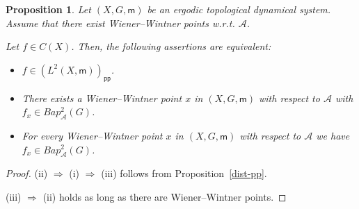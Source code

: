 \documentclass [14pt]{amsart}
\numberwithin{equation}{section}
\newcommand{\cA}{{\mathcal A}}
\newcommand{\mm}{\mathsf{m}}
\newcommand{\bap}{Bap}
\newtheorem{prop}[theorem]{Proposition}
\begin{document}
\begin{prop}\label{finpp} Let $(X,G,\mm)$ be an ergodic topological  dynamical system. Assume that there exist Wiener--Wintner points w.r.t. $\cA$.

Let $f \in C(X)$. Then, the following assertions  are equivalent:
\begin{itemize}
  \item[(i)] $f \in (L^2(X,\mm))_{\mathsf{pp}}$.
  \item[(ii)] There exists a Wiener--Wintner point $x$  in $(X,G,\mm)$ with respect to $\cA$  with $f_x \in \bap^2_{\cA}(G)$.
\item[(iii)] For every Wiener--Wintner point $x$ in $(X,G,\mm)$ with respect to $\cA$ we have $f_x \in \bap^2_{\cA}(G)$.
\end{itemize}
\end{prop}
\begin{proof}
(ii) $\Longrightarrow$ (i) $\Longrightarrow$  (iii) follows from Proposition~\ref{dist-pp}.

(iii) $\Longrightarrow$ (ii) holds as long as there are Wiener--Wintner points.
\end{proof}
\end{document}
